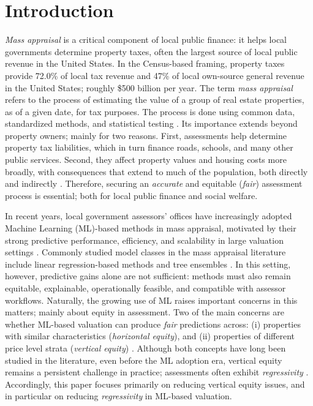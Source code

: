 \documentclass[12pt, draft]{article}
\theoremstyle{plain}
\theoremstyle{definition}
\newcommand{\1}{\mathbf{1}}
\begin{document}
\begin{abstract}
\end{abstract}

\section{Introduction}



\textit{Mass appraisal} is a critical component of local public finance: it helps local governments determine property taxes, often the largest source of local public revenue in the United States. In the \textcite{Berry2021} Census-based framing, property taxes provide 72.0\% of local tax revenue and 47\% of local own-source general revenue in the United States; roughly \$500 billion per year. The term \textit{mass appraisal} refers to the process of estimating the value of a group of real estate properties, as of a given date, for tax purposes. The process is done using common data, standardized methods, and statistical testing \cite{IAAO2025Mass}. Its importance extends beyond property owners; mainly for two reasons. First, assessments help determine property tax liabilities, which in turn finance roads, schools, and many other public services.  Second, they affect property values and housing costs more broadly, with consequences that extend to much of the population, both directly and indirectly \cite{Berry2021, Rootetal2023}. Therefore, securing an \textit{accurate} and equitable (\textit{fair}) assessment process is essential; both for local public finance and social welfare.

In recent years, local government assessors' offices have increasingly adopted Machine Learning (ML)-based methods in mass appraisal, motivated by their strong predictive performance, efficiency, and scalability in large valuation settings \cite{IAAOAITaskForce2022,BidansetRakow2022,Rootetal2023}. Commonly studied model classes in the mass appraisal literature include linear regression-based methods and tree ensembles \cite{Rootetal2023,Ostrikova2024,Sevgen2024100111}. In this setting, however, predictive gains alone are not sufficient: methods must also remain equitable, explainable, operationally feasible, and compatible with assessor workflows. Naturally, the growing use of ML raises important concerns in this matters; mainly about equity in assessment. Two of the main concerns are whether ML-based valuation can produce \textit{fair} predictions across: (i) properties with similar characteristics (\textit{horizontal equity}), and (ii) properties of different price level strata (\textit{vertical equity}) \cite{Quintos2014,10578d49-78f8-3ef9-8277-9b6add2bd071,cornia2006property}. Although both concepts have long been studied in the literature, even before the ML adoption era, vertical equity remains a persistent challenge in practice; assessments often exhibit \textit{regressivity} \cite{McMillen2020,IAAO2023VerticalReview,McMillenSingh2023}. Accordingly, this paper focuses primarily on reducing vertical equity issues, and in particular on reducing \textit{regressivity} in ML-based valuation.
\end{document}
